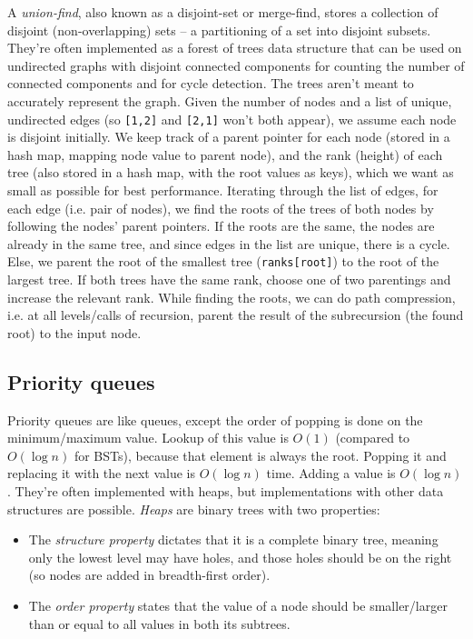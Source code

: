 \documentclass[table, xcdraw]{article}%
\begin{document}
A \emph{union-find}, also known as a disjoint-set or merge-find, stores a collection of disjoint (non-overlapping) sets -- a partitioning of a set into disjoint subsets. They're often implemented as a forest of trees data structure that can be used on undirected graphs with disjoint connected components for counting the number of connected components and for cycle detection. The trees aren't meant to accurately represent the graph. Given the number of nodes and a list of unique, undirected edges (so \texttt{[1,2]} and \texttt{[2,1]} won't both appear), we assume each node is disjoint initially. We keep track of a parent pointer for each node (stored in a hash map, mapping node value to parent node), and the rank (height) of each tree (also stored in a hash map, with the root values as keys), which we want as small as possible for best performance. Iterating through the list of edges, for each edge (i.e. pair of nodes), we find the roots of the trees of both nodes by following the nodes' parent pointers. If the roots are the same, the nodes are already in the same tree, and since edges in the list are unique, there is a cycle. Else, we parent the root of the smallest tree (\texttt{ranks[root]}) to the root of the largest tree. If both trees have the same rank, choose one of two parentings and increase the relevant rank. While finding the roots, we can do path compression, i.e. at all levels/calls of recursion, parent the result of the subrecursion (the found root) to the input node.

\subsection{Priority queues}

Priority queues are like queues, except the order of popping is done on the minimum/maximum value. Lookup of this value is $O(1)$ (compared to $O(\log n)$ for BSTs), because that element is always the root. Popping it and replacing it with the next value is $O(\log n)$ time. Adding a value is $O(\log n)$. They're often implemented with heaps, but implementations with other data structures are possible. \emph{Heaps} are binary trees with two properties:

\begin{itemize}
    \item The \emph{structure property} dictates that it is a complete binary tree, meaning only the lowest level may have holes, and those holes should be on the right (so nodes are added in breadth-first order).
    \item The \emph{order property} states that the value of a node should be smaller/larger than or equal to all values in both its subtrees.
\end{itemize}
\end{document}
